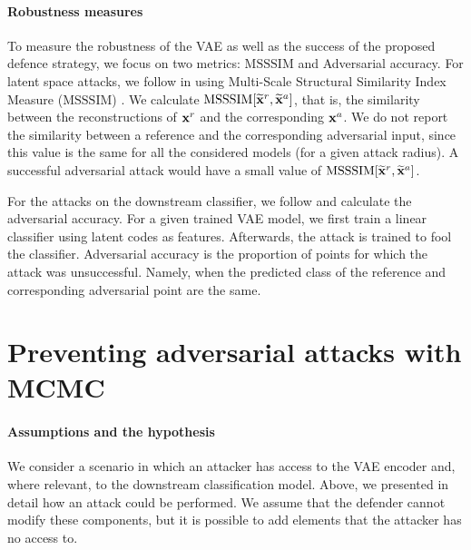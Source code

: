 \paragraph{Robustness measures} 
To measure the robustness of the VAE as well as the success of the proposed defence strategy, we focus on two metrics: $\mathrm{MSSSIM}$ and Adversarial accuracy.
For latent space attacks, we follow \citet{kuzina2021adv} in using Multi-Scale Structural Similarity Index Measure ($\mathrm{MSSSIM}$) \citep{wang2003multiscale}. We calculate $\mathrm{MSSSIM}[\widetilde{{\mathbf{x}}}^{r}, \widetilde{{\mathbf{x}}}^{a}]$, that is, the similarity between the reconstructions of ${\mathbf{x}}^{r}$ and the corresponding ${\mathbf{x}}^{a}$. We do not report the similarity between a reference and the corresponding adversarial input, since this value is the same for all the considered models (for a given attack radius). A successful adversarial attack would have a small value of  $\mathrm{MSSSIM}[\widetilde{{\mathbf{x}}}^{r}, \widetilde{{\mathbf{x}}}^{a}]$. 

For the attacks on the downstream classifier, we follow \citet{cemgil2020autoencoding, Cemgil2019-vn} and calculate the adversarial accuracy. For a given trained VAE model, we first train a linear classifier using latent codes as features. Afterwards, the attack is trained to fool the classifier. Adversarial accuracy is the proportion of points for which the attack was unsuccessful. Namely, when the predicted class of the reference and corresponding adversarial point are the same.  

\section{Preventing adversarial attacks with MCMC} \label{sec:defence}

\paragraph{Assumptions and the hypothesis}

We consider a scenario in which an attacker has access to the VAE encoder and, where relevant, to the downstream classification model. Above, we presented in detail how an attack could be performed. We assume that the defender cannot modify these components, but it is possible to add elements that the attacker has no access to. 

